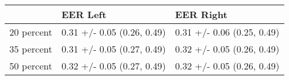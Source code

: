 \begin{tabular}{lll}
\toprule
{} &                    EER Left &                   EER Right \\
\midrule
20 percent &  0.31 +/- 0.05 (0.26, 0.49) &  0.31 +/- 0.06 (0.25, 0.49) \\
35 percent &  0.31 +/- 0.05 (0.27, 0.49) &  0.32 +/- 0.05 (0.26, 0.49) \\
50 percent &  0.32 +/- 0.05 (0.27, 0.49) &  0.32 +/- 0.05 (0.26, 0.49) \\
\bottomrule
\end{tabular}
